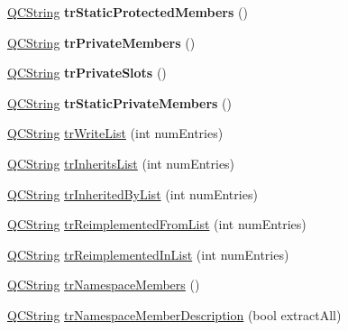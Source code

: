 \begin{DoxyCompactItemize}
\item 
\mbox{\label{class_translator_polish_a2ee548d74d01e7b179d8d4d17a65fbd2}} 
\mbox{\hyperlink{class_q_c_string}{Q\+C\+String}} {\bfseries tr\+Static\+Protected\+Members} ()
\item 
\mbox{\label{class_translator_polish_aaca021924f68f1994608c5f8e5efcd52}} 
\mbox{\hyperlink{class_q_c_string}{Q\+C\+String}} {\bfseries tr\+Private\+Members} ()
\item 
\mbox{\label{class_translator_polish_af0c96471d2796902f26a48c5e61888f0}} 
\mbox{\hyperlink{class_q_c_string}{Q\+C\+String}} {\bfseries tr\+Private\+Slots} ()
\item 
\mbox{\label{class_translator_polish_ace04bf94fbd55f6a88b14be88ddbcbd7}} 
\mbox{\hyperlink{class_q_c_string}{Q\+C\+String}} {\bfseries tr\+Static\+Private\+Members} ()
\item 
\mbox{\hyperlink{class_q_c_string}{Q\+C\+String}} \mbox{\hyperlink{class_translator_polish_ac620731bc7c549f184826d9e558db0aa}{tr\+Write\+List}} (int num\+Entries)
\item 
\mbox{\hyperlink{class_q_c_string}{Q\+C\+String}} \mbox{\hyperlink{class_translator_polish_a46060df2c96f771844d1228b29d893ce}{tr\+Inherits\+List}} (int num\+Entries)
\item 
\mbox{\hyperlink{class_q_c_string}{Q\+C\+String}} \mbox{\hyperlink{class_translator_polish_a2ee269237103a5832d56224baec80bef}{tr\+Inherited\+By\+List}} (int num\+Entries)
\item 
\mbox{\hyperlink{class_q_c_string}{Q\+C\+String}} \mbox{\hyperlink{class_translator_polish_ad0b200adbf810f8fb14c57d7a7a504e9}{tr\+Reimplemented\+From\+List}} (int num\+Entries)
\item 
\mbox{\hyperlink{class_q_c_string}{Q\+C\+String}} \mbox{\hyperlink{class_translator_polish_ab10c7bca3bfb29ce5fb16265b86afdef}{tr\+Reimplemented\+In\+List}} (int num\+Entries)
\item 
\mbox{\hyperlink{class_q_c_string}{Q\+C\+String}} \mbox{\hyperlink{class_translator_polish_a42107865ec985e1f36ee2f251cba3760}{tr\+Namespace\+Members}} ()
\item 
\mbox{\hyperlink{class_q_c_string}{Q\+C\+String}} \mbox{\hyperlink{class_translator_polish_a2d92c886d795fc270e91223ac0bc6984}{tr\+Namespace\+Member\+Description}} (bool extract\+All)

\end{DoxyCompactItemize}
